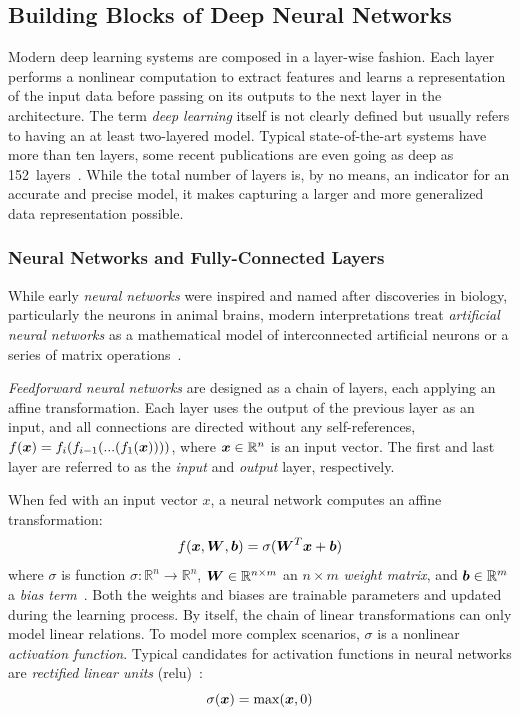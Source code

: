 \subsection{Building Blocks of Deep Neural Networks}
Modern deep learning systems are composed in a layer-wise fashion. Each layer performs a nonlinear computation to extract features and learns a representation of the input data before passing on its outputs to the next layer in the architecture. The term \emph{deep learning} itself is not clearly defined but usually refers to having an at least two-layered model. Typical state-of-the-art systems have more than ten layers, some recent publications are even going as deep as \num{152}~layers~\cite{he2016deep}. While the total number of layers is, by no means, an indicator for an accurate and precise model, it makes capturing a larger and more generalized data representation possible.

\subsubsection{Neural Networks and Fully-Connected Layers}
While early \emph{neural networks} were inspired and named after discoveries in biology, particularly the neurons in animal brains, modern interpretations treat \emph{artificial neural networks} as a mathematical model of interconnected artificial neurons or a series of matrix operations~\cite{mcculloch1943logical, rosenblatt1958perceptron}.

\emph{Feedforward neural networks} are designed as a chain of layers, each applying an affine transformation. Each layer uses the output of the previous layer as an input, and all connections are directed without any self-references, $ f(\boldsymbol{x}) = f_i(f_{i-1}(...(f_1(\boldsymbol{x})))) $, where $\boldsymbol{x} \in \mathbb{R}^n $ is an input vector. The first and last layer are referred to as the \emph{input} and \emph{output} layer, respectively.

When fed with an input vector $x$, a neural network computes an affine transformation:
$$
f(\boldsymbol{x}, \boldsymbol{W}, \boldsymbol{b}) = \sigma(\boldsymbol{W}^T\boldsymbol{x} + \boldsymbol{b})
$$
where $\sigma$ is function $\sigma: \mathbb{R}^n \rightarrow \mathbb{R}^n$, $\boldsymbol{W} \in\mathbb{R}^{n \times m} $ an $n \times m$ \emph{weight matrix}, and $\boldsymbol{b} \in\mathbb{R}^m $ a \emph{bias term}~\cite[p.~192]{Goodfellow-et-al-2016}. Both the weights and biases are trainable parameters and updated during the learning process. By itself, the chain of linear transformations can only model linear relations. To model more complex scenarios, $\sigma$ is a nonlinear \emph{activation function}. Typical candidates for activation functions in neural networks are \emph{rectified linear units} (\ac{relu})~\cite{nair2010rectified}:
$$
\sigma(\boldsymbol{x}) = \operatorname{max}(\boldsymbol{x}, 0)
$$

